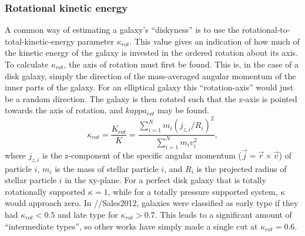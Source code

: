 \subsubsection{Rotational kinetic energy}
A common way of estimating a galaxy's ``diskyness'' is to use the rotational-to-total-kinetic-energy parameter $\kappa_{rot}$. This value gives an indication of how much of the kinetic energy of the galaxy is invested in the ordered rotation about its axis. To calculate $\kappa_{rot}$, the axis of rotation must first be found. This is, in the case of a disk galaxy, simply the direction of the mass-averaged angular momentum of the inner parts of the galaxy. For an elliptical galaxy this ``rotation-axis'' would just be a random direction. The galaxy is then rotated such that the z-axis is pointed towards the axis of rotation, and $kappa_{rot}$ may be found.
\begin{equation}
    \kappa_{rot} = \frac{K_{rot}}{K} = \frac{\sum_{i=1}^{N} m_i (j_{z, i}/R_i)^2}{\sum_{i=1}^{N} m_i v_i^2},
\end{equation}
where $j_{z, i}$ is the z-component of the specific angular momentum ($\vec{j} = \vec{r} \times \vec{v}$) of particle $i$, $m_i$ is the mass of stellar particle $i$, and $R_i$ is the projected radius of stellar particle $i$ in the xy-plane. For a perfect disk galaxy that is totally rotationally supported $\kappa = 1$, while for a totally pressure supported system, $\kappa$ would approach zero. In //Sales2012, galaxies were classified as early type if they had $\kappa_{rot} < 0.5$ and late type for $\kappa_{rot} > 0.7$. This leads to a significant amount of ``intermediate types'', so other works have simply made a single cut at $\kappa_{rot} = 0.6$.